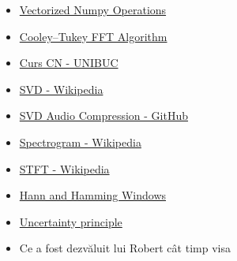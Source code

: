 \documentclass[12pt]{article}
\begin{document}
\begin{itemize}
    \item \href{https://www.pythonlikeyoumeanit.com/Module3_IntroducingNumpy/VectorizedOperations.html}{Vectorized Numpy Operations}
    \item \href{https://en.wikipedia.org/wiki/Cooley–Tukey_FFT_algorithm}{Cooley–Tukey FFT Algorithm}
    \item \href{https://numeric.cs.unibuc.ro/cn/cn-curs-6.pdf}{Curs CN - UNIBUC}
    \item \href{https://en.wikipedia.org/wiki/Singular_value_decomposition}{SVD - Wikipedia}
    \item \href{https://github.com/mich1803/SVD-Audio-Compression}{SVD Audio Compression - GitHub}
    \item \href{https://en.wikipedia.org/wiki/Spectrogram}{Spectrogram - Wikipedia}
    \item \href{https://en.wikipedia.org/wiki/Short-time_Fourier_transform}{STFT - Wikipedia}
    \item \href{https://en.wikipedia.org/wiki/Window_function#Hann_and_Hamming_windows}{Hann and Hamming Windows}
    \item \href{https://en.wikipedia.org/wiki/Uncertainty_principle}{Uncertainty principle}
    \item Ce a fost dezvăluit lui Robert cât timp visa
\end{itemize}
\end{document}
